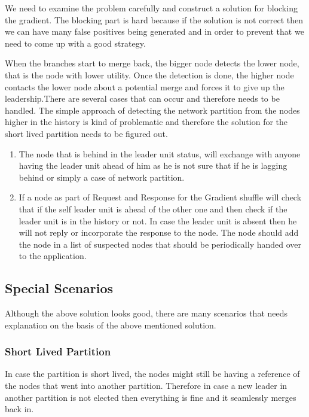 \documentclass[a4paper, 11pt]{article}
\begin{document}
We need to examine the problem carefully and construct a solution for blocking the gradient. The blocking part is hard because if the solution is not correct then we can have many false positives being generated and in order to prevent that we need to come up with a good strategy.

When the branches start to merge back, the bigger node detects the lower node, that is the node with lower utility. Once the detection is done, the higher node contacts the lower node about a potential merge and forces it to give up the leadership.There are several cases that can occur and therefore needs to be handled. The simple approach of detecting the network partition from the nodes higher in  the history is kind of problematic and therefore the solution for the short lived partition needs to be figured out.

\begin{enumerate}

\item The node that is behind in the leader unit status, will exchange with anyone having the leader unit ahead of him as he is not sure that if he is lagging behind or simply a case of network partition. 

\item If a node as part of Request and Response for the Gradient shuffle will check that if the self leader unit is ahead of the other one and then check if the leader unit is in the history or not. In case the leader unit is absent then he will not reply or incorporate the response to the node. The node should add the node in a list of suspected nodes that should be periodically handed over to the application. 

\end{enumerate}

\subsection{Special Scenarios}

Although the above solution looks good, there are many scenarios that needs explanation on the basis of the above mentioned solution.

\subsubsection{Short Lived Partition}
In case the partition is short lived, the nodes might still be having a reference of the nodes that went into another partition. Therefore in case a new leader in another partition is not elected then everything is fine and it seamlessly merges back in.\\
\end{document}
